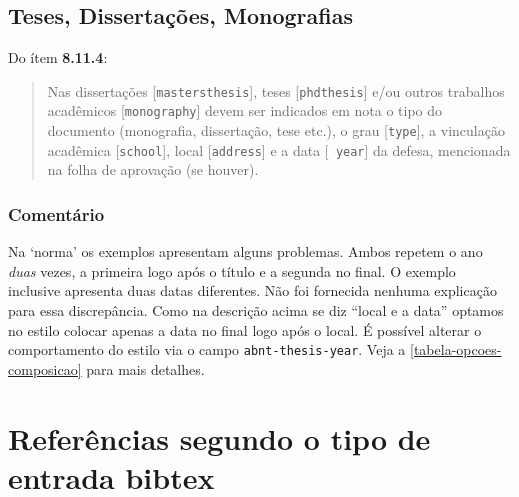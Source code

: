 \documentclass[a4paper]{ltxdoc}
\begin{document}
\subsection{Teses, Dissertações, Monografias}
\label{sec-teses}

Do ítem {\bf 8.11.4}\cite{NBR6023:2000}:
\begin{quote}
Nas dissertações [{\tt mastersthesis}], teses [{\tt phdthesis}] e/ou outros
trabalhos acadêmicos [{\tt monography}] devem ser indicados em nota o tipo do
documento (monografia, dissertação, tese etc.), o grau [{\tt type}], a
vinculação acadêmica [{\tt school}], local [{\tt address}] e a data [{\tt
year}] da defesa, mencionada na folha de aprovação (se houver).
\cite{8.11.4-1,8.11.4-2,8.11.4-1b,8.11.4-1c}
\end{quote}

\subsubsection{Comentário}
Na `norma' os exemplos  apresentam alguns
problemas. Ambos repetem o ano \emph{duas} vezes, a primeira logo após o título
e a segunda no final. O exemplo  inclusive apresenta
duas datas diferentes. Não foi fornecida nenhuma explicação para essa
discrepância. Como na descrição acima se diz ``local e a data'' optamos no
estilo colocar apenas a data no final logo após o local. É possível alterar o
comportamento do estilo via o campo {\tt abnt-thesis-year}. Veja a
\autoref{tabela-opcoes-composicao} para mais detalhes.

\section{Referências segundo o tipo de entrada \textsf{bibtex}}
\end{document}
